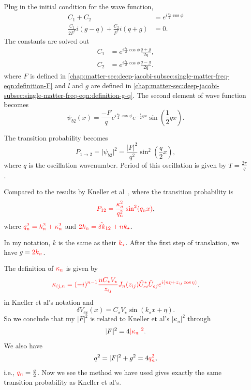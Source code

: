 Plug in the initial condition for the wave function,
\begin{align}
   C_1 + C_2 &= e^{i \frac{z_k}{2}\cos \phi} \\
   \frac{C_1}{2F^ * } i \left( g - q \right) + \frac{C _ 2}{ F ^ *} i \left( q + g  \right) & = 0.
\end{align}
The constants are solved out
\begin{align}
   C_1 &= e^{i \frac{z_k}{2}\cos \phi} \frac{q + g }{2 q} , \\
   C_2 &= e^{i \frac{z_k}{2}\cos \phi} \frac{ q - g }{2 q}.
\end{align}
where $F$ is defined in \ref{chap:matter-sec:deep-jacobi-subsec:single-matter-freq-eqn:definition-F} and $l$ and $g$ are defined in \ref{chap:matter-sec:deep-jacobi-subsec:single-matter-freq-eqn:definition-g-q}.
The second element of wave function becomes
\begin{equation}
   \psi_{b2}(x) = \frac{- F}{ q } e^{i\frac{z_k}{2} \cos\phi} e^{- \frac{i}{2}gx} \sin \left( \frac{1}{2} q x \right).
\end{equation}

The transition probability becomes
\begin{equation}
   P_{1\to 2} = \lvert \psi_{b2} \rvert^2 = \frac{\lvert F \rvert^2}{q^2} \sin^2\left( \frac{ q }{2} x \right),
\end{equation}
where $q$ is the oscillation wavenumber. Period of this oscillation is given by $T = \frac{2\pi}{q}$.

Compared to the results by Kneller et al~\cite{Kneller2013}, where the transition probability is
\begin{equation}
    {\color{red}P_{12} = \frac{\kappa_n^2}{q_n^2} \sin^2 (q_n x)},
\end{equation}
where $\color{red}q_n^2 = k_n^2 + \kappa_n^2$ and $\color{red}2k_n = \tilde{\delta k}_{12} + n k_\star$.

In my notation, $k$ is the same as their $\color{red}k_\star$. After the first step of translation, we have $g = \color{red} 2 k_n$.

The definition of $\color{red}\kappa_n$ is given by
\begin{equation}
    {\color{red}\kappa_{ij,n} = (-i)^{n-1} \frac{n C_\star V_\star}{z_{ij}} J_n(z_{ij}) \tilde U_{ei}^* \tilde U_{ej} e^{i ( n \eta + z_{ij} \cos \eta)} },
\end{equation}
in Kneller et al's notation and
\begin{equation}
  \delta V_{ee}(x) = C_\star V_\star \sin (k_\star x + \eta).
\end{equation}
So we conclude that my $\lvert F \rvert ^2$ is related to Kneller et al's $\lvert \kappa_n \rvert^2$ through
\begin{equation}
  \lvert F \rvert^2 = 4 {\color{red} \lvert \kappa_n \rvert^2}.
\end{equation}
We also have
\begin{equation}
  q^2 = \lvert F \rvert ^2 + g^2  = 4 {\color{red} q_n^2},
\end{equation}
i.e., ${\color{red}q_n} = \frac{ q }{2}$.
Now we see the method we have used gives exactly the same transition probability as Kneller et al's.


